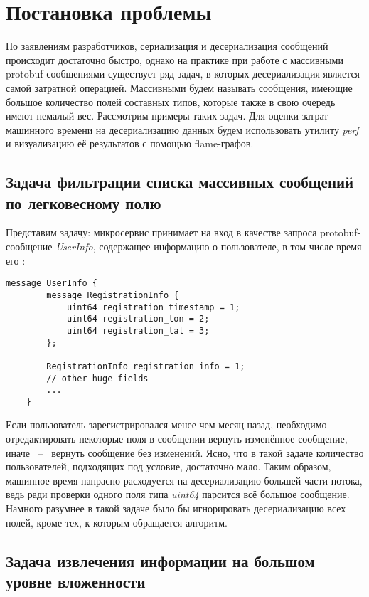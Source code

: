 \section{Постановка проблемы}
\label{sec_problem}

По заявлениям разработчиков, сериализация и десериализация сообщений происходит достаточно быстро, однако
на практике при работе с массивными protobuf-сообщениями существует ряд задач, в которых десериализация является самой затратной операцией.
Массивными будем называть сообщения, имеющие большое количество полей составных типов, которые также в свою очередь имеют немалый вес.
Рассмотрим примеры таких задач. Для оценки затрат машинного времени на десериализацию данных будем использовать утилиту \textit{perf} и визуализацию её результатов с помощью flame-графов.

\subsection{Задача фильтрации списка массивных сообщений по легковесному полю}
\label{sec_problem:sec:problem1}

Представим задачу: микросервис принимает на вход в качестве запроса protobuf-сообщение \textit{UserInfo}, содержащее информацию о пользователе,
в том числе время его :

\begin{lstlisting}[style=CodeListing, label={sec_problem:listing:userinfo}, caption={protobuf-сообщение UserInfo}]
    message UserInfo {
        message RegistrationInfo {
            uint64 registration_timestamp = 1;
            uint64 registration_lon = 2;
            uint64 registration_lat = 3;
        };

        RegistrationInfo registration_info = 1;
        // other huge fields
        ... 
    }
\end{lstlisting}

Если пользователь зарегистрировался менее чем месяц назад, необходимо отредактировать некоторые поля в сообщении вернуть изменённое сообщение,
иначе ~--~ вернуть сообщение без изменений. Ясно, что в такой задаче количество пользователей, подходящих под условие, достаточно мало.
Таким образом, машинное время напрасно расходуется на десериализацию большей части потока, ведь ради проверки одного поля типа \textit{uint64} парсится всё большое сообщение.
Намного разумнее в такой задаче было бы игнорировать десериализацию всех полей, кроме тех, к которым обращается алгоритм.

\subsection{Задача извлечения информации на большом уровне вложенности}


